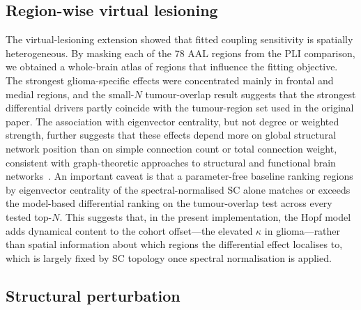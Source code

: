 \documentclass[11pt, reprint, aps, prl, floatfix, secnumarabic]{revtex4-2}
\begin{document}
\subsection{Region-wise virtual lesioning}

The virtual-lesioning extension showed that fitted coupling sensitivity is spatially heterogeneous. By masking each of the 78 AAL regions from the PLI comparison, we obtained a whole-brain atlas of regions that influence the fitting objective. The strongest glioma-specific effects were concentrated mainly in frontal and medial regions, and the small-$N$ tumour-overlap result suggests that the strongest differential drivers partly coincide with the tumour-region set used in the original paper. The association with eigenvector centrality, but not degree or weighted strength, further suggests that these effects depend more on global structural network position than on simple connection count or total connection weight, consistent with graph-theoretic approaches to structural and functional brain networks~\cite{BullmoreSporns2009}. An important caveat is that a parameter-free baseline ranking regions by eigenvector centrality of the spectral-normalised SC alone matches or exceeds the model-based differential ranking on the tumour-overlap test across every tested top-$N$. This suggests that, in the present implementation, the Hopf model adds dynamical content to the cohort offset---the elevated $\kappa$ in glioma---rather than spatial information about which regions the differential effect localises to, which is largely fixed by SC topology once spectral normalisation is applied.

\subsection{Structural perturbation}
\end{document}
